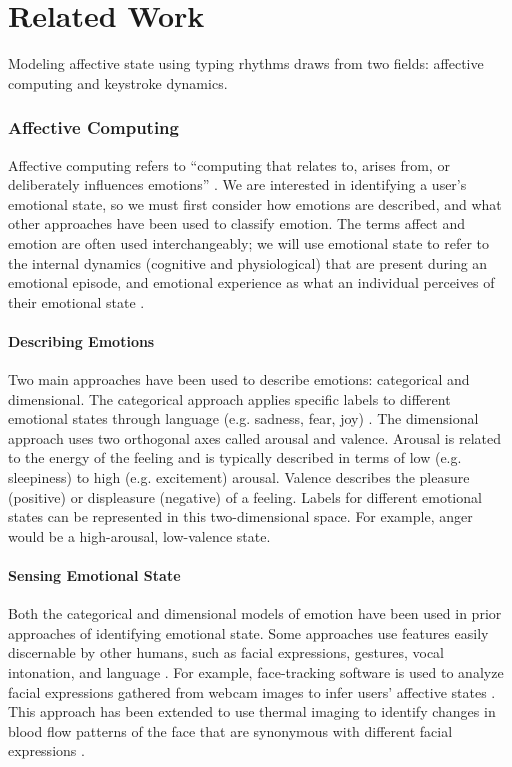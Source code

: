 \chapter{Related Work}
\begin{flushleft}
Modeling affective state using typing rhythms draws from
two fields: affective computing and keystroke dynamics.

\subsection{Affective Computing}
Affective computing refers to “computing that relates to,
arises from, or deliberately influences emotions” \cite{picard}. We
are interested in identifying a user’s emotional state, so we
must first consider how emotions are described, and what
other approaches have been used to classify emotion. The
terms affect and emotion are often used interchangeably;
we will use emotional state to refer to the internal dynamics
(cognitive and physiological) that are present during an
emotional episode, and emotional experience as what an
individual perceives of their emotional state \cite{picard}.

\subsubsection{Describing Emotions}
Two main approaches have been used to describe emotions:
categorical and dimensional. The categorical approach
applies specific labels to different emotional states through
language (e.g. sadness, fear, joy) \cite{ekman}. The dimensional
approach \cite{russell} uses two orthogonal axes called arousal and
valence. Arousal is related to the energy of the feeling and
is typically described in terms of low (e.g. sleepiness) to
high (e.g. excitement) arousal. Valence describes the
pleasure (positive) or displeasure (negative) of a feeling.
Labels for different emotional states can be represented in
this two-dimensional space. For example, anger would be a
high-arousal, low-valence state.
\subsubsection{Sensing Emotional State}

Both the categorical and dimensional models of emotion
have been used in prior approaches of identifying emotional
state. Some approaches use features easily discernable by
other humans, such as facial expressions, gestures, vocal
intonation, and language \cite{picard}. For example, face-tracking
software is used to analyze facial expressions gathered from
webcam images to infer users’ affective states  \cite{silva, partala}. This
approach has been extended to use thermal imaging to
identify changes in blood flow patterns of the face that are
synonymous with different facial expressions \cite{khan}.


\end{flushleft}
